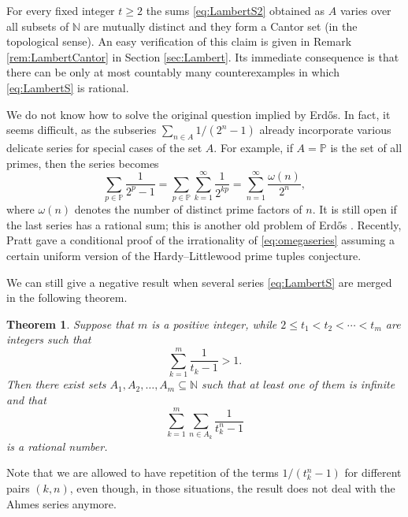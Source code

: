 \documentclass[11pt,letterpaper,reqno]{amsart}
\numberwithin{equation}{section}
\newtheorem{theorem}{Theorem}[section]
\theoremstyle{definition}
\numberwithin{equation}{section}
\begin{document}
For every fixed integer $t\geqslant2$ the sums \eqref{eq:LambertS2} obtained as $A$ varies over all subsets of $\mathbb{N}$ are mutually distinct and they form a Cantor set (in the topological sense). An easy verification of this claim is given in Remark \ref{rem:LambertCantor} in Section \ref{sec:Lambert}.
Its immediate consequence is that there can be only at most countably many counterexamples in which \eqref{eq:LambertS} is rational.

We do not know how to solve the original question implied by Erd\H{o}s. In fact, it seems difficult, as the subseries $\sum_{n\in A} 1/(2^n-1)$ already incorporate various delicate series for special cases of the set $A$.
For example, if $A=\mathbb{P}$ is the set of all primes, then the series becomes
\begin{equation}\label{eq:omegaseries}
\sum_{p\in\mathbb{P}} \frac{1}{2^p-1} = \sum_{p\in\mathbb{P}} \sum_{k=1}^\infty \frac{1}{2^{kp}} = \sum_{n=1}^\infty \frac{\omega(n)}{2^n},
\end{equation}
where $\omega(n)$ denotes the number of distinct prime factors of $n$. It is still open if the last series has a rational sum; this is another old problem of Erd\H{o}s \cite[Problem \#69]{EP}.
Recently, Pratt \cite{Pra24} gave a conditional proof of the irrationality of \eqref{eq:omegaseries} assuming a certain uniform version of the Hardy--Littlewood prime tuples conjecture.

We can still give a negative result when several series \eqref{eq:LambertS} are merged in the following theorem.

\begin{theorem}\label{thm:mergedLambert}
Suppose that $m$ is a positive integer, while $2\leqslant t_1<t_2<\cdots<t_m$ are integers such that
\begin{equation}\label{eq:merLcond}
\sum_{k=1}^{m} \frac{1}{t_k-1} > 1.
\end{equation}
Then there exist sets $A_1,A_2,\ldots,A_m\subseteq\mathbb{N}$ such that at least one of them is infinite and that
\begin{equation}\label{eq:merLsum}
\sum_{k=1}^{m} \sum_{n\in A_k} \frac{1}{t_k^n-1}
\end{equation}
is a rational number.
\end{theorem}

Note that we are allowed to have repetition of the terms $1/(t_k^n-1)$ for different pairs $(k,n)$, even though, in those situations, the result does not deal with the Ahmes series anymore.
\end{document}
